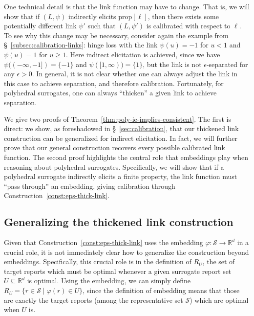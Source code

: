 \documentclass[11pt]{article}
\newcommand{\reals}{\mathbb{R}}
\newcommand{\prop}[1]{\mathrm{prop}[#1]}
\newcommand{\Sc}{\mathcal{S}}
\begin{document}
One technical detail is that the link function may have to change.
That is, we will show that if $(L,\psi)$ indirectly elicits $\prop{\ell}$, then there exists some potentially different link $\psi'$ such that $(L,\psi')$ is calibrated with respect to $\ell$.
To see why this change may be necessary, consider again the example from \S~\ref{subsec:calibration-links}:
hinge loss with the link $\psi(u) = -1$ for $u < 1$ and $\psi(u) = 1$ for $u\geq 1$.
Here indirect elicitation is achieved, since we have $\psi((-\infty,-1]) = \{-1\}$ and $\psi([1,\infty)) = \{1\}$, but the link is not $\epsilon$-separated for any $\epsilon>0$.
In general, it is not clear whether one can always adjust the link in this case to achieve separation, and therefore calibration.
Fortunately, for polyhedral surrogates, one can always ``thicken'' a given link to achieve separation.

We give two proofs of Theorem~\ref{thm:poly-ie-implies-consistent}.
The first is direct: we show, as foreshadowed in \S~\ref{sec:calibration}, that our thickened link construction can be generalized for indirect elicitation.
In fact, we will further prove that our general construction recovers every possible calibrated link function.
The second proof highlights the central role that embeddings play when reasoning about polyhedral surrogates.
Specifically, we will show that if a polyhedral surrogate indirectly elicits a finite property, the link function must ``pass through'' an embedding, giving calibration through Construction~\ref{const:eps-thick-link}.

\subsection{Generalizing the thickened link construction}

Given that Construction~\ref{const:eps-thick-link} uses the embedding $\varphi:\Sc\to\reals^d$ in a crucial role, it is not immediately clear how to generalize the construction beyond embeddings.
Specifically, this crucial role is in the definition of $R_U$, the set of target reports which must be optimal whenever a given surrogate report set $U\subseteq\reals^d$ is optimal.
Using the embedding, we can simply define $R_U = \{ r\in\Sc \mid \varphi(r) \in U \}$, since the definition of embedding means that those are exactly the target reports (among the representative set $\Sc$) which are optimal when $U$ is.
\end{document}
